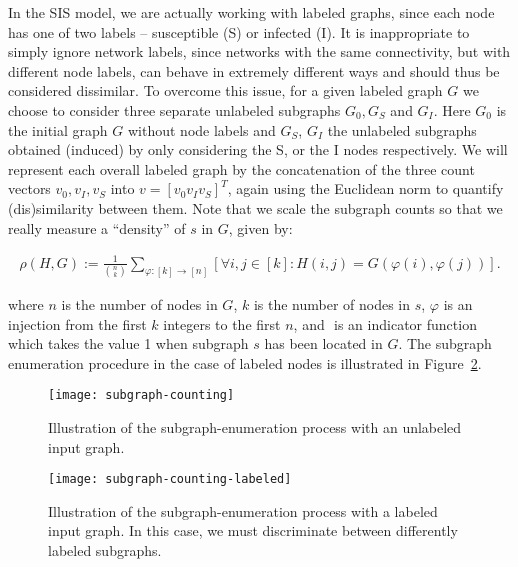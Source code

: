 In the SIS model, we are actually working with labeled graphs, since
each node has one of two labels – susceptible (S) or infected (I). It
is inappropriate to simply ignore network labels, since networks with
the same connectivity, but with different node labels, can behave in
extremely different ways and should thus be considered dissimilar. To
overcome this issue, for a given labeled graph $G$ we choose to
consider three separate unlabeled subgraphs $G_0, G_S$ and $G_I$. Here
$G_0$ is the initial graph $G$ without node labels and $G_S$, $G_I$
the unlabeled subgraphs obtained (induced) by only considering the S,
or the I nodes respectively. We will represent each overall labeled
graph by the concatenation of the three count vectors $v_0, v_I, v_S$
into $v = [v_0 v_I v_S]^T$, again using the Euclidean norm to quantify (dis)similarity
between them. Note that we scale the subgraph counts so that we really
measure a “density” of $s$ in $G$, given by:

\begin{align}
  \label{eqn:homdenG}
  \rho(H,G) := \frac{1}{{n\choose k}} \!  \sum_{\varphi:[k] \to [n]} \!
  \left[ \forall  i, j \in [k] \! : \! H(i,j) \! = \! G(\varphi(i),
  \varphi(j)) \right].
\end{align}

where $n$ is the number of nodes in $G$, $k$ is the number of nodes in
$s$, $\varphi$ is an injection from the first $k$ integers to the
first $n$, and $\!$ is an indicator function which takes the value 1
when subgraph $s$ has been located in $G$. The subgraph enumeration
procedure in the case of labeled nodes is illustrated in Figure~\ref{fig:sis5}.

\begin{figure}[!htp]
\centering
\texttt{[image: subgraph-counting]}
\caption[Illustration of subgraph-enumeration process for unlabeled graphs]{Illustration of the subgraph-enumeration process with an
  unlabeled input graph. \label{fig:sis4}}
\end{figure}

\begin{figure}[!htp]
\centering
\texttt{[image: subgraph-counting-labeled]}
\caption[Illustration of subgraph-enumeration process for labeled graphs]{Illustration of the subgraph-enumeration process with a
  labeled input graph. In this case, we must discriminate between
  differently labeled subgraphs. \label{fig:sis5}}
\end{figure}

